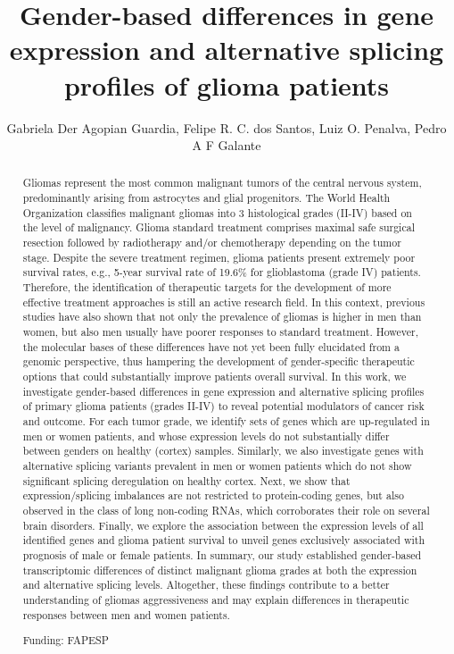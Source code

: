 \documentclass[twoside]{article}
\title{\vspace{-15mm}\fontsize{24pt}{10pt}\selectfont\textbf{ Gender-based differences in gene expression and alternative splicing profiles of glioma patients }} %
\author{ Gabriela Der Agopian Guardia, Felipe R. C. dos Santos, Luiz O. Penalva, Pedro A F Galante }
\affil{ Children’s Cancer Research Institute,  UT Health San Antonio,  San Antonio,  Texas,  USA }
\date{}
\begin{document}
  
  
  \maketitle %
  
  
  \thispagestyle{fancy} %
  
  
  \begin{abstract}
  Gliomas represent the most common malignant tumors of the central nervous system,  predominantly arising from astrocytes and glial progenitors. The World Health Organization classifies malignant gliomas into 3 histological grades (II-IV) based on the level of malignancy. Glioma standard treatment comprises maximal safe surgical resection followed by radiotherapy and/or chemotherapy depending on the tumor stage. Despite the severe treatment regimen,  glioma patients present extremely poor survival rates,  e.g.,  5-year survival rate of 19.6\% for glioblastoma (grade IV) patients. Therefore,  the identification of therapeutic targets for the development of more effective treatment approaches is still an active research field. In this context,  previous studies have also shown that not only the prevalence of gliomas is higher in men than women,  but also men usually have poorer responses to standard treatment. However,  the molecular bases of these differences have not yet been fully elucidated from a genomic perspective,  thus hampering the development of gender-specific therapeutic options that could substantially improve patients overall survival. In this work,  we investigate gender-based differences in gene expression and alternative splicing profiles of primary glioma patients (grades II-IV) to reveal potential modulators of cancer risk and outcome. For each tumor grade,  we identify sets of genes which are up-regulated in men or women patients,  and whose expression levels do not substantially differ between genders on healthy (cortex) samples. Similarly,  we also investigate genes with alternative splicing variants prevalent in men or women patients which do not show significant splicing deregulation on healthy cortex. Next,  we show that expression/splicing imbalances are not restricted to protein-coding genes,  but also observed in the class of long non-coding RNAs,  which corroborates their role on several brain disorders. Finally,  we explore the association between the expression levels of all identified genes and glioma patient survival to unveil genes exclusively associated with prognosis of male or female patients. In summary,  our study established gender-based transcriptomic differences of distinct malignant glioma grades at both the expression and alternative splicing levels. Altogether,  these findings contribute to a better understanding of gliomas aggressiveness and may explain differences in therapeutic responses between men and women patients.
  
  Funding: FAPESP \\ 
  \end{abstract}
  
\end{document}
